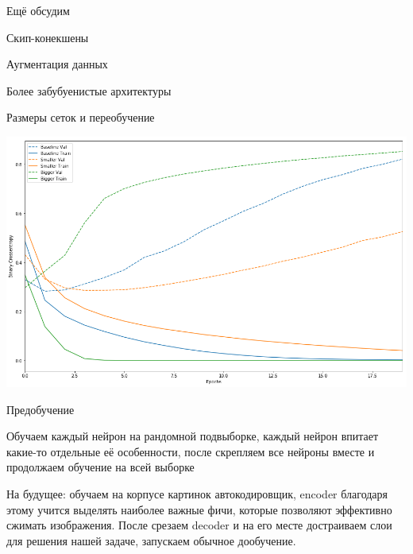 \documentclass[notes,12pt, aspectratio=169]{beamer}
\newenvironment{wideitemize}{\itemize\addtolength{\itemsep}{10pt}}{\enditemize}
\begin{document}
\begin{frame}{Ещё обсудим}
\begin{wideitemize}
\item Скип-конекшены 
\item Аугментация данных 
\item Более забубуенистые архитектуры 
\end{wideitemize}
\end{frame}


\begin{frame}{Размеры сеток и переобучение}
\begin{center}
\includegraphics[width=0.7\paperwidth]{big_base_small_fit.png}
\end{center}
\end{frame}


\begin{frame}{Предобучение}
\begin{wideitemize}
	\item  Обучаем каждый нейрон на рандомной подвыборке, каждый нейрон впитает какие-то отдельные её особенности, после скрепляем все нейроны вместе и продолжаем обучение на всей выборке
	
	\item  \alert{На будущее:} обучаем на корпусе картинок автокодировщик, encoder благодаря этому учится выделять наиболее важные фичи, которые позволяют эффективно сжимать изображения. После срезаем decoder и на его месте достраиваем слои для решения нашей задаче, запускаем обычное дообучение.
\end{wideitemize}
\end{frame}
\end{document}
